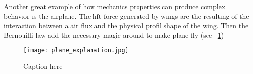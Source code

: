 






Another great example of how mechanics properties can produce complex behavior is the airplane. The lift force generated by wings are the resulting of the interaction between a air flux and the physical profil shape of the wing. Then the Bernouilli law add the necessary magic around to make plane fly (see \figurename~\ref{fig:magic_plane})

\begin{figure}[tb]
    \begin{center}
        \texttt{[image: plane\_explanation.jpg]}
    \end{center}
    \caption{Caption here}
    \label{fig:magic_plane}
\end{figure}

